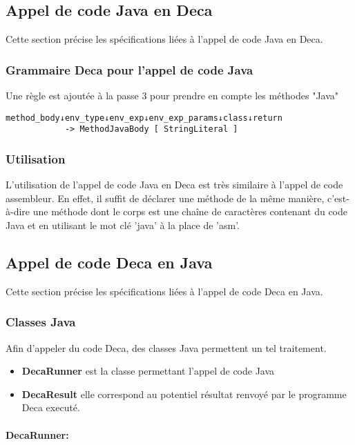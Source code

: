 \documentclass[12pt, a4paper, one side]{article}
\newcommand{\paragraphln}[1]{\paragraph{#1}\mbox{}\\}
\begin{document}
    \subsection{Appel de code Java en Deca}
    Cette section précise les spécifications liées à l'appel de code Java en Deca.
        \subsubsection{Grammaire Deca pour l'appel de code Java}
        Une règle est ajoutée à la passe 3 pour prendre en compte les méthodes "Java"
\begin{lstlisting}
method_body↓env_type↓env_exp↓env_exp_params↓class↓return
            -> MethodJavaBody [ StringLiteral ]
\end{lstlisting}

        \subsubsection{Utilisation}
        L'utilisation de l'appel de code Java en Deca est très similaire à l'appel de code assembleur. En effet, il suffit de déclarer une méthode de la même manière, c'est-à-dire une méthode dont le corps est une chaîne de caractères contenant du code Java et en utilisant le mot clé 'java' à la place de 'asm'.

    \subsection{Appel de code Deca en Java}
    Cette section précise les spécifications liées à l'appel de code Deca en Java.
    \lstset{style=mystyle}

        \subsubsection{Classes Java}
        Afin d'appeler du code Deca, des classes Java permettent un tel traitement.

        \begin{itemize}
            \item \textbf{DecaRunner} est la classe permettant l'appel de code Java
            \item \textbf{DecaResult} elle correspond au potentiel résultat renvoyé par le programme Deca executé.
        \end{itemize}

        \paragraphln{DecaRunner:}
\end{document}

